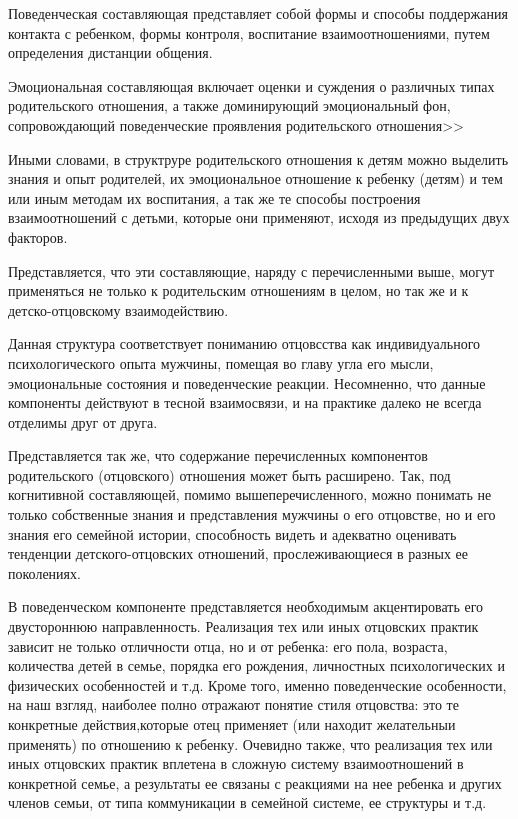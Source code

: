 \documentclass{../../common/thesisbyxetex}
\begin{document}
Поведенческая составляющая представляет собой формы и способы поддержания
контакта с ребенком, формы контроля, воспитание взаимоотношениями, путем
определения дистанции общения.

Эмоциональная составляющая включает оценки и суждения о различных типах
родительского отношения, а также доминирующий эмоциональный фон,
сопровождающий поведенческие проявления родительского отношения>> \cite{varga}

Иными словами, в структруре родительского отношения к детям можно выделить знания и опыт родителей,
их эмоциональное отношение к ребенку (детям) и тем или иным методам их воспитания, а так же те
способы построения взаимоотношений с детьми,
которые они применяют, исходя из предыдущих двух факторов.

Представляется, что эти составляющие,
наряду с перечисленными выше, могут применяться не только к родительским отношениям в целом, но
так же и к детско-отцовскому взаимодействию.

Данная структура соответствует пониманию отцовсства как индивидуального психологического опыта
мужчины, помещая во главу угла его мысли, эмоциональные состояния и поведенческие реакции.
Несомненно, что данные компоненты действуют в тесной взаимосвязи, и на практике далеко не всегда
отделимы друг от друга.

Представляется так же, что содержание перечисленных компонентов родительского (отцовского)
отношения может быть расширено. Так, под когнитивной составляющей, помимо вышеперечисленного, можно
понимать не только собственные знания и представления мужчины о его отцовстве, но и его
знания его семейной истории, способность видеть и адекватно оценивать тенденции детского-отцовских
отношений, прослеживающиеся в разных ее поколениях.

В поведенческом компоненте
представляется необходимым акцентировать его двустороннюю направленность. Реализация тех или иных
отцовских практик зависит не только отличности отца, но и от ребенка: его пола, возраста, количества
детей в семье, порядка его рождения, личностных психологических и физических особенностей и т.д.
Кроме того, именно поведенческие особенности, на наш взгляд, наиболее полно отражают понятие
стиля отцовства: это те конкретные действия,которые отец применяет (или находит желательныи
применять) по отношению к ребенку. Очевидно также, что реализация тех или иных отцовских практик
вплетена в
сложную систему взаимоотношений в конкретной семье, а результаты ее связаны с реакциями на
нее ребенка и других членов семьи, от типа коммуникации в семейной системе, ее структуры и т.д.
\end{document}
